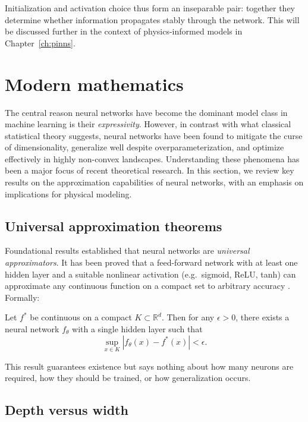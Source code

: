 Initialization and activation choice thus form an inseparable pair: together 
they determine whether information propagates stably through the network. This will be discussed further in the context of physics-informed models in Chapter~\ref{ch:pinns}.


\section{Modern mathematics}
\label{sec:nn_approximation}

The central reason neural networks have become the dominant model class in machine 
learning is their \emph{expressivity}. However, in contrast with what classical statistical theory suggests, neural networks have been found to 
mitigate the curse of dimensionality, generalize well despite overparameterization, and
optimize effectively in highly non-convex landscapes. Understanding these phenomena
has been a major focus of recent theoretical research. In this section, we review key
results on the approximation capabilities of neural networks, with an emphasis on
implications for physical modeling.

\subsection{Universal approximation theorems}
Foundational results established that neural networks are \emph{universal approximators}. 
It has been proved that a feed-forward network with at least one 
hidden layer and a suitable nonlinear activation (e.g.\ sigmoid, ReLU, tanh) can approximate 
any continuous function on a compact set to arbitrary accuracy \cite{Cybenko1989,HORNIK1991251}. Formally:

\begin{theorem}
Let $f^\ast$ be continuous on a compact $K\subset\mathbb{R}^d$. 
Then for any $\epsilon>0$, there exists a neural network $f_\theta$ with a single hidden 
layer such that
\[
  \sup_{x\in K} |f_\theta(x) - f^\ast(x)| < \epsilon.
\]
\end{theorem}

This result guarantees existence but says nothing about how many neurons are required, 
how they should be trained, or how generalization occurs.  

\subsection{Depth versus width}

